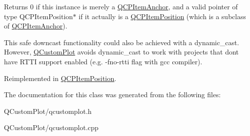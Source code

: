 Returns 0 if this instance is merely a \mbox{\hyperlink{class_q_c_p_item_anchor}{Q\+C\+P\+Item\+Anchor}}, and a valid pointer of type Q\+C\+P\+Item\+Position$\ast$ if it actually is a \mbox{\hyperlink{class_q_c_p_item_position}{Q\+C\+P\+Item\+Position}} (which is a subclass of \mbox{\hyperlink{class_q_c_p_item_anchor}{Q\+C\+P\+Item\+Anchor}}).

This safe downcast functionality could also be achieved with a dynamic\+\_\+cast. However, \mbox{\hyperlink{class_q_custom_plot}{Q\+Custom\+Plot}} avoids dynamic\+\_\+cast to work with projects that don\textquotesingle{}t have R\+T\+TI support enabled (e.\+g. -\/fno-\/rtti flag with gcc compiler). 

Reimplemented in \mbox{\hyperlink{class_q_c_p_item_position_a008ff9ebe645a963671b68bcf7f7a1c0}{Q\+C\+P\+Item\+Position}}.



The documentation for this class was generated from the following files\+:\begin{DoxyCompactItemize}
\item 
Q\+Custom\+Plot/qcustomplot.\+h\item 
Q\+Custom\+Plot/qcustomplot.\+cpp\end{DoxyCompactItemize}
